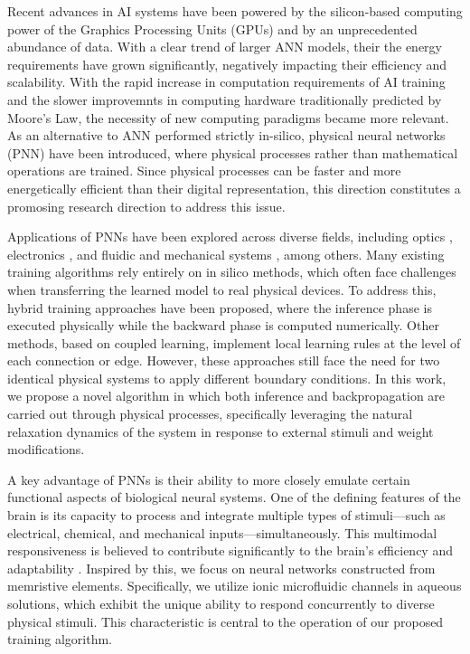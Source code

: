 \documentclass[reprint,superscriptaddress,prb,showkeys]{revtex4-2}
\begin{document}
Recent advances in AI systems have been powered by the silicon-based computing power of the Graphics Processing Units (GPUs) and by an unprecedented abundance of data. With a clear trend of larger ANN models, their the energy requirements have grown significantly, negatively impacting their efficiency and scalability\cite{energy_cost_ml1, energy_cost_ml2}. With the rapid increase in computation requirements of AI training and the slower improvemnts in computing hardware traditionally predicted by Moore's Law, the necessity of new computing paradigms became more relevant.  As an alternative to ANN performed strictly in-silico, physical neural networks (PNN) have been introduced, where physical processes rather than mathematical operations are trained\cite{trainingphysicalneuralnetworks}. Since physical processes can be faster and more energetically efficient than their digital representation, this direction constitutes a promosing research direction to address this issue.

Applications of PNNs have been explored across diverse fields, including optics \cite{optics1}, electronics \cite{electronics1}, and fluidic and mechanical systems \cite{}, among others. Many existing training algorithms rely entirely on in silico methods, which often face challenges when transferring the learned model to real physical devices. To address this, hybrid training approaches have been proposed, where the inference phase is executed physically while the backward phase is computed numerically. Other methods, based on coupled learning, implement local learning rules at the level of each connection or edge. However, these approaches still face the need for two identical physical systems to apply different boundary conditions. In this work, we propose a novel algorithm in which both inference and backpropagation are carried out through physical processes, specifically leveraging the natural relaxation dynamics of the system in response to external stimuli and weight modifications.

A key advantage of PNNs is their ability to more closely emulate certain functional aspects of biological neural systems. One of the defining features of the brain is its capacity to process and integrate multiple types of stimuli—such as electrical, chemical, and mechanical inputs—simultaneously. This multimodal responsiveness is believed to contribute significantly to the brain’s efficiency and adaptability \cite{}. Inspired by this, we focus on neural networks constructed from memristive elements. Specifically, we utilize ionic microfluidic channels in aqueous solutions\cite{Rene_IonicNeuromorphic}, which exhibit the unique ability to respond concurrently to diverse physical stimuli. This characteristic is central to the operation of our proposed training algorithm.
\end{document}
